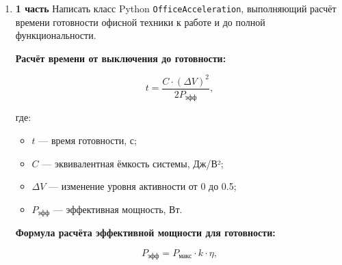 \begin{enumerate}
\begin{itemize}
    \item Router — $C = 0{,}008$ Дж/В², $P = 12$ Вт;  
    \item Switch — $C = 0{,}012$ Дж/В², $P = 25$ Вт;  
    \item Firewall — $C = 0{,}018$ Дж/В², $P = 40$ Вт.  
\end{itemize}

\textbf{3 часть}

На основе программного кода и параметров устройств из 2 части текущего практикума отобразить через класс с множественным наследованием \texttt{NetworkDevice} расчёт времени активации сервисов от уровня 0.6 до 1.0 через каждые 0.1, учитывая, что коэффициент мощности $k = 0{,}60$ увеличивается через каждые 0.1 на 0{,}07.

\textbf{Коэффициенты мощности для различных диапазонов активации:}
\begin{itemize}
    \item 0.6–0.7: $k = 0{,}60$;  
    \item 0.7–0.8: $k = 0{,}67$;  
    \item 0.8–0.9: $k = 0{,}74$;  
    \item 0.9–1.0: $k = 0{,}81$.  
\end{itemize}


\item[22] \textbf{1 часть}  
Написать класс Python \texttt{OfficeAcceleration}, выполняющий расчёт времени готовности офисной техники к работе и до полной функциональности.

\textbf{Расчёт времени от выключения до готовности:}

\begin{equation}
t = \frac{C \cdot (\Delta V)^2}{2P_{\text{эфф}}},
\end{equation}

где:  
\begin{itemize}
    \item $t$ — время готовности, с;  
    \item $C$ — эквивалентная ёмкость системы, Дж/В²;  
    \item $\Delta V$ — изменение уровня активности от 0 до 0.5;  
    \item $P_{\text{эфф}}$ — эффективная мощность, Вт.  
\end{itemize}

\textbf{Формула расчёта эффективной мощности для готовности:}

\begin{equation}
P_{\text{эфф}} = P_{\text{макс}} \cdot k \cdot \eta,
\end{equation}


\end{enumerate}
